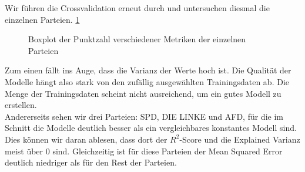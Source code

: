 \documentclass[a4paper,10pt]{scrartcl}
\begin{document}
 Wir führen die Crossvalidation erneut durch und untersuchen diesmal die einzelnen Parteien. \ref{fig:scores_parties} \begin{figure}
 	\centering
 	\caption{Boxplot der Punktzahl verschiedener Metriken der einzelnen Parteien}
 	\label{fig:scores_parties}
 	\end{figure}
 	 Zum einen fällt ins Auge, dass die Varianz der Werte hoch ist. Die Qualität der Modelle hängt also stark von den zufällig ausgewählten Trainingsdaten ab. Die Menge der Trainingsdaten scheint nicht ausreichend, um ein gutes  Modell zu erstellen. \\
Andererseits sehen wir drei Parteien: SPD, DIE LINKE und AFD, für die im Schnitt die Modelle deutlich besser als ein vergleichbares konstantes Modell sind. Dies können wir daran ablesen, dass dort der $R^2$-Score und die Explained Varianz meist über 0 sind. Gleichzeitig ist für diese Parteien der Mean Squared Error deutlich niedriger als für den Rest der Parteien. 
 
\end{document}
